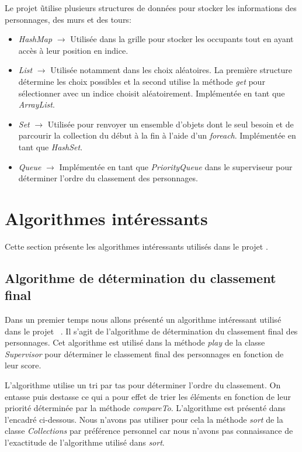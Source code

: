 Le projet \nom\~utilise plusieurs structures de données pour stocker les informations des personnages, des murs et des tours:

\begin{itemize}
    \item \emph{HashMap} $\rightarrow$ Utilisée dans la grille pour stocker les occupants tout en ayant accès à leur position en indice.
    \item \emph{List} $\rightarrow$ Utilisée notamment dans les choix aléatoires. La première structure détermine les choix possibles et la second utilise la méthode \emph{get} pour sélectionner avec un indice choisit aléatoirement. Implémentée en tant que \emph{ArrayList}.
    \item \emph{Set} $\rightarrow$ Utilisée pour renvoyer un ensemble d'objets dont le seul besoin et de parcourir la collection du début à la fin à l'aide d'un \emph{foreach}. Implémentée en tant que \emph{HashSet}.
    \item \emph{Queue} $\rightarrow$ Implémentée en tant que \emph{PriorityQueue} dans le superviseur pour déterminer l'ordre du classement des personnages.
\end{itemize}

\section{Algorithmes intéressants}

Cette section présente les algorithmes intéressants utilisés dans le projet \nom.

\subsection{Algorithme de détermination du classement final}

Dans un premier temps nous allons présenté un algorithme intéressant utilisé dans le projet \nom~. Il s'agit de l'algorithme de détermination du classement final des personnages. Cet algorithme est utilisé dans la méthode \emph{play} de la classe \emph{Supervisor} pour déterminer le classement final des personnages en fonction de leur score. 

L'algorithme utilise un tri par tas pour déterminer l'ordre du classement. On entasse puis destasse ce qui a pour effet de trier les éléments en fonction de leur priorité déterminée par la méthode \emph{compareTo}. L'algorithme est présenté dans l'encadré ci-dessous. Nous n'avons pas utiliser pour cela la méthode \emph{sort} de la classe \emph{Collections} par préférence personnel car nous n'avons pas connaissance de l'exactitude de l'algorithme utilisé dans \emph{sort}.


